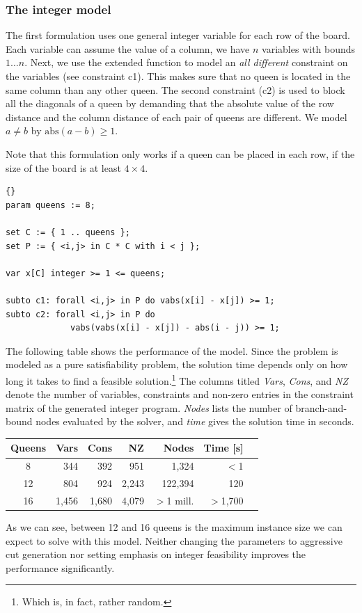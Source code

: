 \subsubsection{The integer model}
\label{nqueens}
The first formulation uses
one general integer variable for each row of the board.
Each variable can assume the value of a column, \ie we have $n$ variables
with bounds $1\ldots n$. Next, we use the
 extended function to model an \emph{all different}
constraint on the variables (see constraint c1).
This makes sure that no queen is located
in the same column than any other queen.
The second constraint (c2) is used to block all the diagonals of a
queen by demanding that the absolute value of the row
distance and the column distance of each pair of queens are
different. We model $a\neq b$ by $\mbox{abs}(a-b)\geq 1$.

Note that this formulation only works if a queen can be placed in each
row, \ie if the size of the board is at least $4\times4$.

\medskip
\begin{lstlisting}[frame=tb]{}
param queens := 8;

set C := { 1 .. queens };
set P := { <i,j> in C * C with i < j };

var x[C] integer >= 1 <= queens;

subto c1: forall <i,j> in P do vabs(x[i] - x[j]) >= 1;
subto c2: forall <i,j> in P do
             vabs(vabs(x[i] - x[j]) - abs(i - j)) >= 1;
\end{lstlisting}

\medskip
\noindent The following table shows the performance of the model. Since the
problem is modeled as a
pure satisfiability problem, the solution time depends only on how
long it takes to find a feasible solution.\footnote{Which is, in fact,
rather random.}
The columns titled \emph{Vars}, \emph{Cons}, and \emph{NZ} denote the
number of variables, constraints and non-zero entries in the
constraint matrix of the generated integer program.
\emph{Nodes} lists the number of branch-and-bound nodes evaluated by
the solver, and \emph{time} gives the solution time in \cpu seconds.
\begin{center}
{\sffamily\small
\begin{tabular}{crrrrrr}
\toprule
Queens & Vars & Cons &   NZ      & Nodes & Time [s]\\
\midrule
   8    &   344 &   392 &    951 &   1,324   & $<$1\\
  12    &   804 &   924 &  2,243 & 122,394   &  120\\
  16    & 1,456 & 1,680 &  4,079 & $>$1 mill.& $>$1,700\\
\bottomrule
\end{tabular}
}
\end{center}
As we can see, between 12 and 16 queens is the maximum instance size
we can expect to solve with this model. Neither changing the \cplex parameters
to aggressive cut generation nor setting emphasis on integer
feasibility improves the performance significantly.

